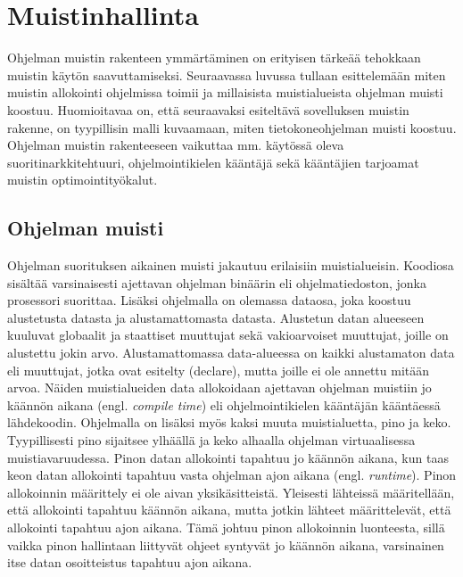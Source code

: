 \chapter{Muistinhallinta} \label{Toinen luku}

Ohjelman muistin rakenteen ymmärtäminen on erityisen tärkeää tehokkaan muistin käytön saavuttamiseksi. Seuraavassa luvussa tullaan esittelemään miten muistin allokointi ohjelmissa toimii
ja millaisista muistialueista ohjelman muisti koostuu. Huomioitavaa on, että seuraavaksi esiteltävä sovelluksen muistin rakenne, on tyypillisin malli kuvaamaan, miten tietokoneohjelman muisti koostuu. Ohjelman muistin rakenteeseen vaikuttaa mm. käytössä oleva suoritinarkkitehtuuri, ohjelmointikielen kääntäjä sekä kääntäjien tarjoamat muistin optimointityökalut.

\section{Ohjelman muisti}

Ohjelman suorituksen aikainen muisti jakautuu erilaisiin muistialueisin. Koodiosa sisältää varsinaisesti ajettavan ohjelman binäärin eli ohjelmatiedoston, jonka prosessori suorittaa. Lisäksi ohjelmalla on olemassa dataosa, joka koostuu alustetusta datasta ja alustamattomasta datasta. Alustetun datan alueeseen kuuluvat globaalit ja staattiset muuttujat sekä vakioarvoiset muuttujat, joille on alustettu jokin arvo. Alustamattomassa data-alueessa on kaikki alustamaton data eli muuttujat, jotka ovat esitelty (declare), mutta joille ei ole annettu mitään arvoa. Näiden muistialueiden data allokoidaan ajettavan ohjelman muistiin jo käännön aikana (engl. \textit{compile time}) eli ohjelmointikielen kääntäjän kääntäessä lähdekoodin. Ohjelmalla on lisäksi myös kaksi muuta muistialuetta, pino ja keko. Tyypillisesti pino sijaitsee ylhäällä ja keko alhaalla ohjelman virtuaalisessa muistiavaruudessa.\cite{mmic2010} Pinon datan allokointi tapahtuu jo käännön aikana, kun taas keon datan allokointi tapahtuu vasta ohjelman ajon aikana (engl. \textit{runtime})\cite{ddm2015book}. Pinon allokoinnin määrittely ei ole aivan yksikäsitteistä. Yleisesti lähteissä määritellään, että allokointi tapahtuu käännön aikana, mutta jotkin lähteet määrittelevät, että allokointi tapahtuu ajon aikana. Tämä johtuu pinon allokoinnin luonteesta, sillä vaikka pinon hallintaan liittyvät ohjeet syntyvät jo käännön aikana, varsinainen itse datan osoitteistus tapahtuu ajon aikana.

